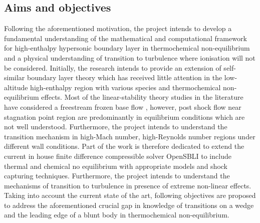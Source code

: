 \subsection{Aims and objectives}\label{subsection:aimsandobjectives}

Following the aforementioned motivation, the project intends to develop a fundamental understanding of the mathematical and computational framework for high-enthalpy hypersonic boundary layer in thermochemical non-equilibrium and a physical understanding of transition to turbulence where ionisation will not be considered. Initially, the research intends to provide an extension of self-similar boundary layer theory which has received little attention in the low-altitude high-enthalpy region with various species and thermochemical non-equilibrium effects. Most of the linear-stability theory studies in the literature have considered a freestream frozen base flow \cite{miromiroThesis}, however, post shock flow near stagnation point region are predominantly in equilibrium conditions which are not well understood. Furthermore, the project intends to understand the transition mechanism in high-Mach number, high-Reynolds number regions under different wall conditions. Part of the work is therefore dedicated to extend the current in house finite difference compressible solver OpenSBLI to include thermal and chemical no equilibrium with appropriate models and shock capturing techniques. Furthermore, the project intends to understand the mechanisms of transition to turbulence in presence of extreme non-linear effects. Taking into account the current state of the art, following objectives are proposed to address the aforementioned crucial gap in knowledge of transitions on a wedge and the leading edge of a blunt body in thermochemical non-equilibrium. 






    
